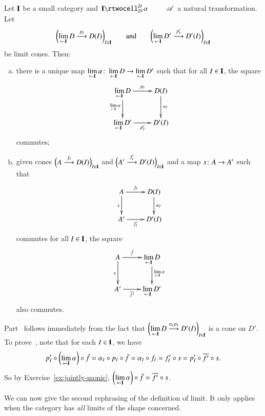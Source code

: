 \begin{lemma}
\label{lemma:lim-functorial}
Let $\mathbf{I}$ be a small category and $\xymatrix@1{\scat{I}
  \rtwocell^D_{D'}{\alpha} &\cat{A}}$ a natural transformation.  Let
\[
\biggl(\lim\limits_{\leftarrow \mathbf{I}} D \stackrel{p_I}{\longrightarrow} D(I)\biggr)_{I \in \mathbf{I}}
\qquad
\text{and}
\qquad
\biggl(\lim\limits_{\leftarrow \mathbf{I}} D' \stackrel{p'_I}{\longrightarrow} D'(I)\biggr)_{I \in \mathbf{I}}
\]
be limit cones.  Then:
%
\begin{enumerate}[(b)]
\item
\label{lemma:lim-functorial:induced}
there is a unique map%
%
%
$\lt{\scat{I}} \alpha \from \lt{\scat{I}} D \to \lt{\scat{I}} D'$ such that
for all $I \in \mathbf{I}$, the square
\[
\xymatrix{
\lt{\scat{I}} D \ar[r]^-{p_I} \ar[d]_{\lt{\scat{I}} \alpha}     &
D(I) \ar[d]^{\alpha_I}    \\
\lt{\scat{I}} D' \ar[r]_-{p'_I}         &
D'(I)
}
\]
commutes;

\item
\label{lemma:lim-functorial:commutes}
given cones $\Bigl(A \stackrel{f_I}{\longrightarrow} D(I)\Bigr)_{I \in \mathbf{I}}$ and $\Bigl(A'
\stackrel{f'_I}{\longrightarrow} D'(I)\Bigr)_{I \in \mathbf{I}}$ and a map $s\from A \to A'$
such that
\[
\xymatrix{
A \ar[r]^-{f_I} \ar[d]_s        &
D(I) \ar[d]^{\alpha_I}  \\
A' \ar[r]_-{f'_I}       &
D'(I)
}
\]
commutes for all $I \in \mathbf{I}$, the square
\[
\xymatrix{
A \ar[r]^-{\bar{f}} \ar[d]_s        &
\lt{\scat{I}} D \ar[d]^{\lt{\scat{I}} \alpha}  \\
A' \ar[r]_-{\ovln{f'}}       &
\lt{\scat{I}} D'
}
\]
also commutes.
\end{enumerate}
\end{lemma}

\begin{pf}
Part~ follows immediately from the fact
that $\biggl(\lim\limits_{\leftarrow \mathbf{I}} D \stackrel{\alpha_I p_I}{\longrightarrow} D'(I)\biggr)_{I \in
  \mathbf{I}}$ is a cone on $D'$.  To
prove~, note that for each $I \in
\mathbf{I}$, we have
\[
p'_I \mathbin{\circ} \biggl(\lim\limits_{\leftarrow \mathbf{I}} \alpha\biggr) \mathbin{\circ} \bar{f}
=
\alpha_I \mathbin{\circ} p_I \mathbin{\circ} \bar{f}
=
\alpha_I \mathbin{\circ} f_I
=
f'_I \mathbin{\circ} s
=
p'_I \mathbin{\circ} \overline{f'} \mathbin{\circ} s.
\]
So by Exercise~\ref{ex:jointly-monic},
$\biggl(\lim\limits_{\leftarrow \mathbf{I}} \alpha \biggr) \mathbin{\circ} \bar{f} = \overline{f'} \mathbin{\circ} s$.
\end{pf}

We can now give the second rephrasing of the definition of limit.  It only
applies when the category has \emph{all} limits of the shape concerned.

